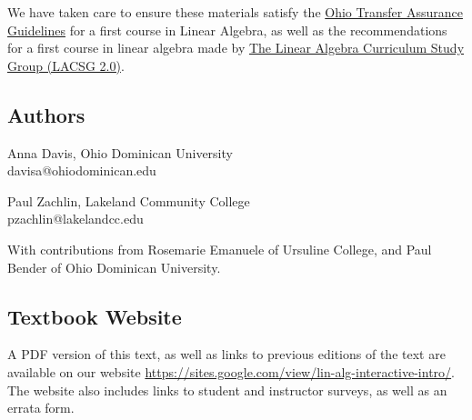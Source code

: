 \documentclass{ximera}
\begin{document}
We have taken care to ensure these materials satisfy the \href{https://dam.assets.ohio.gov/image/upload/transfercredit.ohio.gov/files/transfer/tags/course-descriptions/OMT/OMT019-_ELEMENTARY_LINEAR_ALGEBRA.pdf}{Ohio Transfer Assurance Guidelines}  for a first course in Linear Algebra, as well as the recommendations for a first course in linear algebra made by \href{https://dx.doi.org/10.1090/noti2479}{The Linear Algebra Curriculum Study Group (LACSG 2.0)}.  

\subsection*{Authors}
Anna Davis, Ohio Dominican University\\
davisa@ohiodominican.edu

Paul Zachlin, Lakeland Community College\\
pzachlin@lakelandcc.edu

With contributions from Rosemarie Emanuele of Ursuline College, and Paul Bender of Ohio Dominican University.

\subsection*{Textbook Website}
A PDF version of this text, as well as links to previous editions of the text are available on our website \href{https://sites.google.com/view/lin-alg-interactive-intro/}{https://sites.google.com/view/lin-alg-interactive-intro/}.  The website also includes links to student and instructor surveys, as well as an errata form.
\end{document}

